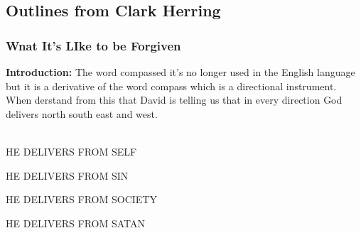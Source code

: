 \subsection{Outlines from Clark Herring}


\subsubsection{Wnat It's LIke to be Forgiven}


\noindent  \textbf{Introduction: } The word compassed it's no longer used in the English language but it is a derivative of the word compass which is a directional instrument. When derstand from this that David is telling us that in every direction God delivers north south east and west.\\
\\
\begin{compactenum}[I.]
    \item HE DELIVERS FROM SELF
    \item HE DELIVERS FROM SIN
    \item HE DELIVERS FROM SOCIETY
    \item HE DELIVERS FROM SATAN
\end{compactenum}



